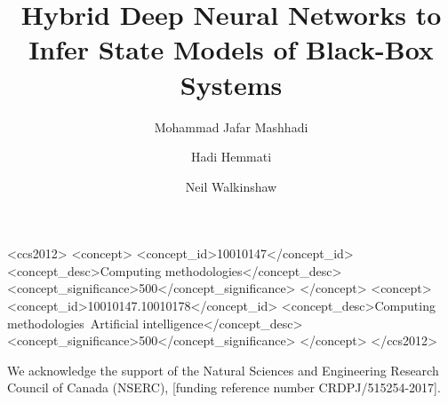\documentclass[sigconf,review, anonymous]{acmart}
\begin{document}
\title{Hybrid Deep Neural Networks to Infer State Models of Black-Box Systems}

\author{Mohammad Jafar Mashhadi}

\author{Hadi Hemmati}

\author{Neil Walkinshaw}

\begin{CCSXML}
<ccs2012>
   <concept>
       <concept_id>10010147</concept_id>
       <concept_desc>Computing methodologies</concept_desc>
       <concept_significance>500</concept_significance>
       </concept>
   <concept>
       <concept_id>10010147.10010178</concept_id>
       <concept_desc>Computing methodologies~Artificial intelligence</concept_desc>
       <concept_significance>500</concept_significance>
       </concept>
 </ccs2012>
\end{CCSXML}




\maketitle

  





\begin{acks}
We acknowledge the support of the Natural Sciences and Engineering Research Council of Canada (NSERC), [funding reference number CRDPJ/515254-2017].
\end{acks}



\end{document}
